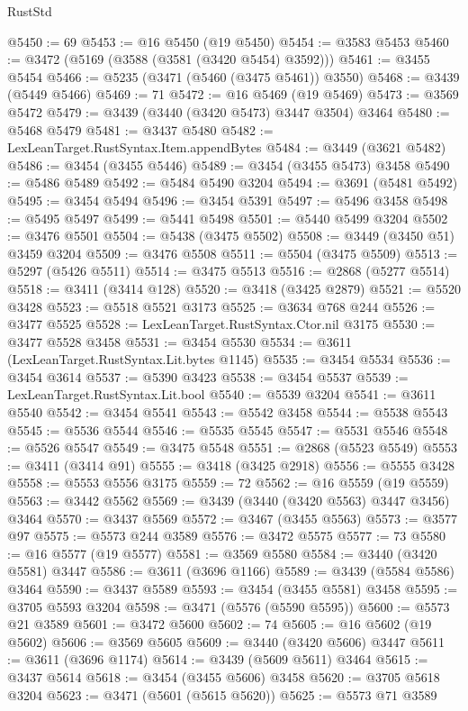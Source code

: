 \begin{lexlean}{RustStd}
\begin{coremodule}
{{{{{{{{{{{{{{{{{{{@5450 := 69
@5453 := @16 @5450 (@19 @5450)
@5454 := @3583 @5453
@5460 := @3472 (@5169 (@3588 (@3581 (@3420 @5454) @3592)))
@5461 := @3455 @5454
@5466 := @5235 (@3471 (@5460 (@3475 @5461)) @3550)
@5468 := @3439 (@5449 @5466)
@5469 := 71
@5472 := @16 @5469 (@19 @5469)
@5473 := @3569 @5472
@5479 := @3439 (@3440 (@3420 @5473) @3447 @3504) @3464
@5480 := @5468 @5479
@5481 := @3437 @5480
@5482 := LexLeanTarget.RustSyntax.Item.appendBytes
@5484 := @3449 (@3621 @5482)
@5486 := @3454 (@3455 @5446)
@5489 := @3454 (@3455 @5473) @3458
@5490 := @5486 @5489
@5492 := @5484 @5490 @3204
@5494 := @3691 (@5481 @5492)
@5495 := @3454 @5494
@5496 := @3454 @5391
@5497 := @5496 @3458
@5498 := @5495 @5497
@5499 := @5441 @5498
@5501 := @5440 @5499 @3204
@5502 := @3476 @5501
@5504 := @5438 (@3475 @5502)
@5508 := @3449 (@3450 @51) @3459 @3204
@5509 := @3476 @5508
@5511 := @5504 (@3475 @5509)
@5513 := @5297 (@5426 @5511)
@5514 := @3475 @5513
@5516 := @2868 (@5277 @5514)
@5518 := @3411 (@3414 @128)
@5520 := @3418 (@3425 @2879)
@5521 := @5520 @3428
@5523 := @5518 @5521 @3173
@5525 := @3634 @768 @244
@5526 := @3477 @5525
@5528 := LexLeanTarget.RustSyntax.Ctor.nil @3175
@5530 := @3477 @5528 @3458
@5531 := @3454 @5530
@5534 := @3611 (LexLeanTarget.RustSyntax.Lit.bytes @1145)
@5535 := @3454 @5534
@5536 := @3454 @3614
@5537 := @5390 @3423
@5538 := @3454 @5537
@5539 := LexLeanTarget.RustSyntax.Lit.bool
@5540 := @5539 @3204
@5541 := @3611 @5540
@5542 := @3454 @5541
@5543 := @5542 @3458
@5544 := @5538 @5543
@5545 := @5536 @5544
@5546 := @5535 @5545
@5547 := @5531 @5546
@5548 := @5526 @5547
@5549 := @3475 @5548
@5551 := @2868 (@5523 @5549)
@5553 := @3411 (@3414 @91)
@5555 := @3418 (@3425 @2918)
@5556 := @5555 @3428
@5558 := @5553 @5556 @3175
@5559 := 72
@5562 := @16 @5559 (@19 @5559)
@5563 := @3442 @5562
@5569 := @3439 (@3440 (@3420 @5563) @3447 @3456) @3464
@5570 := @3437 @5569
@5572 := @3467 (@3455 @5563)
@5573 := @3577 @97
@5575 := @5573 @244 @3589
@5576 := @3472 @5575
@5577 := 73
@5580 := @16 @5577 (@19 @5577)
@5581 := @3569 @5580
@5584 := @3440 (@3420 @5581) @3447
@5586 := @3611 (@3696 @1166)
@5589 := @3439 (@5584 @5586) @3464
@5590 := @3437 @5589
@5593 := @3454 (@3455 @5581) @3458
@5595 := @3705 @5593 @3204
@5598 := @3471 (@5576 (@5590 @5595))
@5600 := @5573 @21 @3589
@5601 := @3472 @5600
@5602 := 74
@5605 := @16 @5602 (@19 @5602)
@5606 := @3569 @5605
@5609 := @3440 (@3420 @5606) @3447
@5611 := @3611 (@3696 @1174)
@5614 := @3439 (@5609 @5611) @3464
@5615 := @3437 @5614
@5618 := @3454 (@3455 @5606) @3458
@5620 := @3705 @5618 @3204
@5623 := @3471 (@5601 (@5615 @5620))
@5625 := @5573 @71 @3589
}}}}}}}}}}}}}}}}}}}
\end{coremodule}
\end{lexlean}
